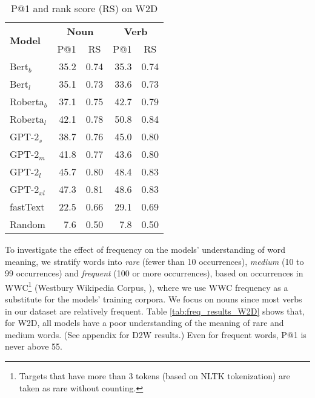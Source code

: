\documentclass[11pt,a4paper]{article}
\begin{document}
\begin{table}
    \centering
    \begin{tabular}{l|rrrr}
        \hline
         \multirow{2}{*}{\textbf{Model}} & \multicolumn{2}{c}{\textbf{Noun}} & \multicolumn{2}{c}{\textbf{Verb}} \\
         & \multicolumn{1}{c}{P@1} & \multicolumn{1}{c}{RS} & \multicolumn{1}{c}{P@1} & \multicolumn{1}{c}{RS} \\ \hline
     Bert$_{b}$ & 35.2 & 0.74 & 35.3 & 0.74 \\
     Bert$_{l}$ & 35.1 & 0.73 & 33.6 & 0.73 \\
     Roberta$_{b}$ & 37.1 & 0.75 & 42.7 & 0.79 \\
     Roberta$_{l}$ & 42.1 & 0.78 & 50.8 & 0.84 \\ \hline
     GPT-2$_{s}$ & 38.7 & 0.76 & 45.0 & 0.80 \\
     GPT-2$_{m}$ & 41.8 & 0.77 & 43.6 & 0.80 \\
     GPT-2$_{l}$ & 45.7 & 0.80 & 48.4 & 0.83 \\
     GPT-2$_{xl}$ & 47.3 & 0.81 & 48.6 & 0.83 \\
     \hline 
     fastText & 22.5 & 0.66 & 29.1 & 0.69 \\ \hline 
     Random & 7.6 & 0.50 & 7.8 & 0.50 \\\hline
     
    \end{tabular}
    \caption{P@1 and rank score (RS) on W2D}
    \label{tab:results_W2D}
\end{table}


To investigate the effect of frequency on the models' understanding of word meaning,
we stratify words into \textit{rare} (fewer than 10 occurrences), \textit{medium} (10 to 99 occurrences) and \textit{frequent} (100 or more occurrences), based on occurrences in WWC\footnote{Targets that have more than 3 tokens (based on NLTK tokenization) are taken as rare without counting.} (Westbury Wikipedia Corpus, ), where we use WWC frequency as a substitute for the models' training corpora. 
We focus on nouns since most verbs in our dataset are relatively frequent. 
Table \ref{tab:freq_results_W2D} shows that, for W2D, all models have a poor understanding of the meaning of rare and medium words. (See appendix for D2W results.) 
Even for frequent words, P@1 is never above 55.
\end{document}
